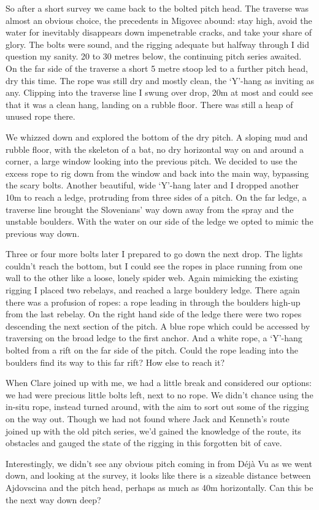 So after a short survey we came back to the bolted pitch head. The traverse was almost an obvious choice, the precedents in Migovec abound: stay high, avoid the water for inevitably disappears down impenetrable cracks, and take your share of glory. The bolts were sound, and the rigging adequate but halfway through I did question my sanity. 20 to 30 metres below, the continuing pitch series awaited. On the far side of the traverse a short 5 metre stoop led to a further pitch head, dry this time. The rope was still dry and mostly clean, the ‘Y’-hang as inviting as any. Clipping into the traverse line I swung over drop, 20m at most and could see that it was a clean hang, landing on a rubble floor. There was still a heap of unused rope there. 

We whizzed down and explored the bottom of the dry pitch. A sloping mud and rubble floor, with the skeleton of a bat, no dry horizontal way on and around a corner, a large window looking into the previous pitch. We decided to use the excess rope to rig down from the window and back into the main way, bypassing the scary bolts. Another beautiful, wide ‘Y’-hang later and I dropped another 10m to reach a ledge, protruding from three sides of a pitch. On the far ledge, a traverse line brought the Slovenians’ way down away from the spray and the unstable boulders. With the water on our side of the ledge we opted to mimic the previous way down. 

Three or four more bolts later I prepared to go down the next drop. The lights couldn’t reach the bottom, but I could see the ropes in place running from one wall to the other like a loose, lonely spider web. Again mimicking the existing rigging I placed two rebelays, and reached a large bouldery ledge. There again there was a profusion of ropes: a rope leading in through the boulders high-up from the last rebelay. On the right hand side of the ledge there were two ropes descending the next section of the pitch. A blue rope which could be accessed by traversing on the broad ledge to the first anchor. And a white rope, a ‘Y’-hang bolted from a rift on the far side of the pitch. Could the rope leading into the boulders find its way to this far rift?  How else to reach it?

When Clare joined up with me, we had a little break and considered our options: we had were precious little bolts left, next to no rope. We didn’t chance using the in-situ rope, instead turned around, with the aim to sort out some of the rigging on the way out. Though we had not found where Jack and Kenneth’s route joined up with the old pitch series, we’d gained the knowledge of the route, its obstacles and gauged the state of the rigging in this forgotten bit of cave. 

Interestingly, we didn’t see any obvious pitch coming in from Déjà Vu as we went down, and looking at the survey, it looks like there is a sizeable distance between Ajdovscina and the pitch head, perhaps as much as 40m horizontally. Can this be the next way down deep?

